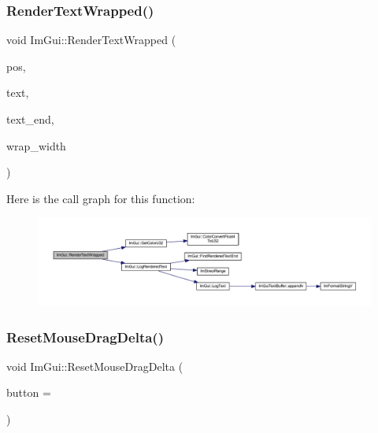 \subsubsection{\texorpdfstring{Render\+Text\+Wrapped()}{RenderTextWrapped()}}
{\footnotesize\ttfamily void Im\+Gui\+::\+Render\+Text\+Wrapped (\begin{DoxyParamCaption}\item[{\mbox{\hyperlink{struct_im_vec2}{Im\+Vec2}}}]{pos,  }\item[{const char $\ast$}]{text,  }\item[{const char $\ast$}]{text\+\_\+end,  }\item[{float}]{wrap\+\_\+width }\end{DoxyParamCaption})}

Here is the call graph for this function\+:
\nopagebreak
\begin{figure}[H]
\begin{center}
\leavevmode
\includegraphics[width=350pt]{namespace_im_gui_aa483b40f6899e1b289b4bf6c2673d1d2_cgraph}
\end{center}
\end{figure}
\mbox{\label{namespace_im_gui_aa03f31a184cafdf506feb2e8ba07f91e}} 
\subsubsection{\texorpdfstring{Reset\+Mouse\+Drag\+Delta()}{ResetMouseDragDelta()}}
{\footnotesize\ttfamily void Im\+Gui\+::\+Reset\+Mouse\+Drag\+Delta (\begin{DoxyParamCaption}\item[{int}]{button = {} }\end{DoxyParamCaption})}

\mbox{\label{namespace_im_gui_ad10f0dd923775bac3903666a2751f08a}} 
